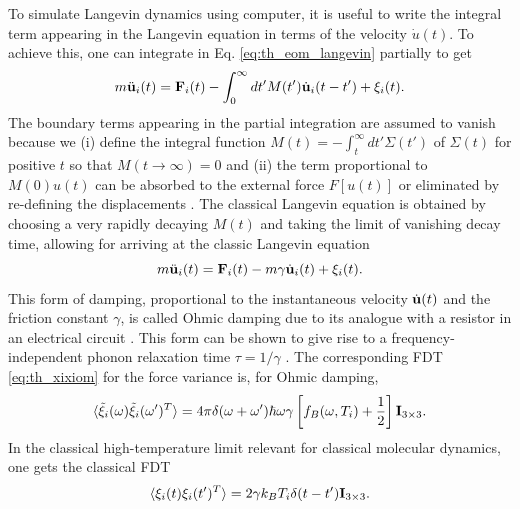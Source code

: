 To simulate Langevin dynamics using computer, it is useful to write the integral term appearing in the Langevin equation in terms of the velocity $\dot{u}(t)$. To achieve this, one can integrate in Eq. \eqref{eq:th_eom_langevin} partially to get
\begin{equation}
 m\ddot{\mathbf{u}}_i(t) =  \mathbf{F}_i(t) - \int_{0}^{\infty}dt' M(t')\dot{\mathbf{u}}_i(t-t') + \xi_i(t). \label{eq:th_langevin_Mt}
\end{equation}
The boundary terms appearing in the partial integration are assumed to vanish because we (i) define the integral function $M(t)=-\int_t^{\infty} dt' \Sigma(t')$ of $\Sigma(t)$ for positive $t$ so that $M(t\to \infty)=0$ and (ii) the term proportional to $M(0)u(t)$ can be absorbed to the external force $F[u(t)]$ or eliminated by re-defining the displacements \cite{weiss}. The classical Langevin equation is obtained by choosing a very rapidly decaying $M(t)$ and taking the limit of vanishing decay time, allowing for arriving at the classic Langevin equation \cite{zwanzig}
\begin{equation}
 m\ddot{\mathbf{u}}_i(t) =  \mathbf{F}_i(t) - m\gamma \dot{\mathbf{u}}_i(t) + \xi_i(t). \label{eq:th_ohmic}
\end{equation}
This form of damping, proportional to the instantaneous velocity $\dot{\mathbf{u}}(t)$ and the friction constant $\gamma$, is called Ohmic damping due to its analogue with a resistor in an electrical circuit \cite{weiss}. This form can be shown to give rise to a frequency-independent phonon relaxation time $\tau=1/\gamma$ \cite{li09jap}. The corresponding FDT \eqref{eq:th_xixiom} for the force variance is, for Ohmic damping,
\begin{equation}
 \langle \tilde \xi_i(\omega) \tilde \xi_i(\omega')^T \rangle = 4\pi \delta(\omega+\omega') \hbar \omega \gamma \left[f_B(\omega,T_i)+ \frac{1}{2} \right] \mathbf{I}_{3\times 3}. \label{eq:th_xixiom_ohmic_qm}
\end{equation}
In the classical high-temperature limit relevant for classical molecular dynamics, one gets the classical FDT \cite{zwanzig}
\begin{equation}
 \langle \xi_i(t) \xi_i(t')^T\rangle=2\gamma k_B T_i \delta(t-t') \mathbf{I}_{3\times 3}. \label{eq:th_corr_ohmic} 
\end{equation}

